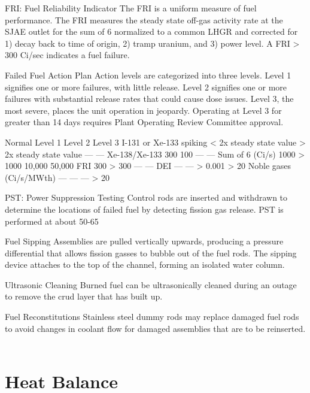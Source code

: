 \documentclass[10pt]{article}
\begin{document}
FRI: Fuel Reliability Indicator
The FRI is a uniform measure of fuel performance. The FRI measures the steady state off-gas activity rate at the SJAE outlet for the sum of 6 normalized to a common LHGR and corrected for 1) decay back to time of origin, 2) tramp uranium, and 3) power level. A FRI > 300 Ci/sec indicates a fuel failure.

Failed Fuel Action Plan
Action levels are categorized into three levels. Level 1 signifies one or more failures, with little release. Level 2 signifies one or more failures with substantial release rates that could cause dose issues. Level 3, the most severe, places the unit operation in jeopardy. Operating at Level 3 for greater than 14 days requires Plant Operating Review Committee approval. 


Normal
Level 1
Level 2
Level 3
I-131 or Xe-133 spiking
< 2x steady state value
> 2x steady state value
---
---
Xe-138/Xe-133
 300
 100
---
---
Sum of 6 (Ci/s)
 1000
> 1000
 10,000
 50,000
FRI
 300
> 300
---
---
DEI
---
---
> 0.001
> 20%
Noble gases (Ci/s/MWth)
---
---
---
> 20%

PST: Power Suppression Testing
Control rods are inserted and withdrawn to determine the locations of failed fuel by detecting fission gas release. PST is performed at about 50-65%

Fuel Sipping
Assemblies are pulled vertically upwards, producing a pressure differential that allows fission gasses to bubble out of the fuel rods. The sipping device attaches to the top of the channel, forming an isolated water column. 

Ultrasonic Cleaning
Burned fuel can be ultrasonically cleaned during an outage to remove the crud layer that has built up. 

Fuel Reconstitutions
Stainless steel dummy rods may replace damaged fuel rods to avoid changes in coolant flow for damaged assemblies that are to be reinserted. 
\section{Heat Balance}
\end{document}

